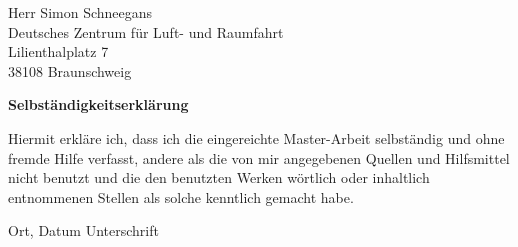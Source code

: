 \documentclass[11pt,DIV12,BCOR0mm,twoside,openright,headings=normal,%
  numbers=noenddot,headsepline,headinclude]{scrreprt}
\begin{document}
\vspace*{.5\baselineskip}
\noindent
Herr Simon Schneegans\\
Deutsches Zentrum für Luft- und Raumfahrt\\
Lilienthalplatz 7\\
38108 Braunschweig


\vfill
\noindent
{\sffamily\bfseries Selbständigkeitserklärung}

\vspace*{.5\baselineskip}
\noindent
Hiermit erkläre ich, dass ich die eingereichte Master-Arbeit selbständig und ohne fremde Hilfe verfasst, andere als die von mir angegebenen Quellen und Hilfsmittel nicht benutzt und die den benutzten Werken wörtlich oder inhaltlich entnommenen Stellen als solche kenntlich gemacht habe.

\vspace*{3\baselineskip}
\noindent
Ort, Datum\hspace{5cm} Unterschrift
\tableofcontents

\cleardoublepage
{}



\appendix



\printbibliography
\end{document}
